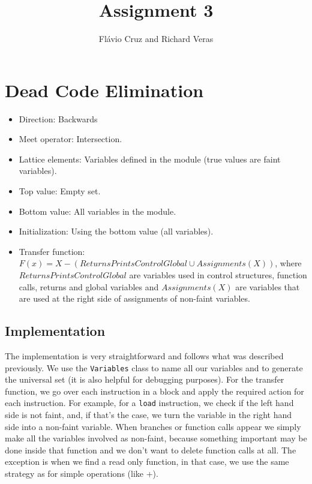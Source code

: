 \documentclass[12pt]{article}
\author{Fl\'{a}vio Cruz and Richard Veras}
\title{Assignment 3}
\begin{document}
\maketitle

\section{Dead Code Elimination}

\begin{itemize}
   \item Direction: Backwards
   \item Meet operator: Intersection.
   \item Lattice elements: Variables defined in the module (true values are faint variables).
   \item Top value: Empty set.
   \item Bottom value: All variables in the module.
   \item Initialization: Using the bottom value (all variables).
   \item Transfer function: $F(x) = X - (ReturnsPrintsControlGlobal \cup Assignments(X))$, where $ReturnsPrintsControlGlobal$ are variables used in control structures, function calls, returns and global variables and $Assignments(X)$ are variables that are used at the right side of assignments of non-faint variables.
\end{itemize}

\subsection{Implementation}

The implementation is very straightforward and follows what was described previously.
We use the \texttt{Variables} class to name all our variables and to generate the universal set (it is also helpful for debugging purposes). For the transfer function, we go over each instruction in a block and apply the required action for each instruction.
For example, for a \texttt{load} instruction, we check if the left hand side is not faint, and, if that's the case, we turn the variable in the right hand side into a non-faint variable. When branches or function calls appear we simply make all the variables involved as non-faint, because something important may be done inside that function and we don't want to delete function calls at all. The exception is when we find a read only function, in that case, we use the same strategy as for simple operations (like +).
\end{document}
